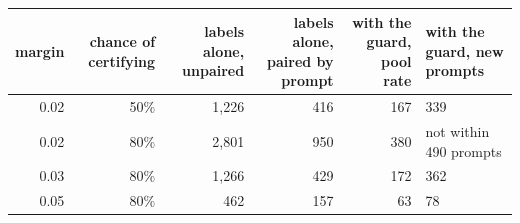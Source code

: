 \begin{tabular}{@{}r r r r r p{3.2cm}@{}}
\toprule
\textbf{margin} & \textbf{chance of certifying} & \textbf{labels alone, unpaired} & \textbf{labels alone, paired by prompt} & \textbf{with the guard, pool rate} & \textbf{with the guard, new prompts} \\
\midrule
0.02 & 50\% & 1,226 & 416 & 167 & 339 \\
0.02 & 80\% & 2,801 & 950 & 380 & not within 490 prompts \\
0.03 & 80\% & 1,266 & 429 & 172 & 362 \\
0.05 & 80\% & 462 & 157 & 63 & 78 \\
\bottomrule
\end{tabular}
